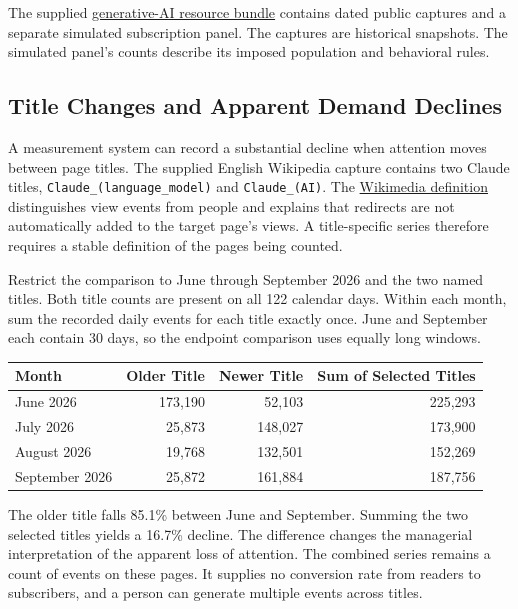 The supplied
\href{../01_Resources/08_M8_Current_Topics_in_Marketing/genai_demand_lab/README.md}{generative-AI
resource bundle} contains dated public captures and a separate simulated
subscription panel. The captures are historical snapshots. The simulated
panel's counts describe its imposed population and behavioral rules.

\hypertarget{M02-title-changes-and-apparent-demand-declines}{%
\subsection{Title Changes and Apparent Demand
Declines}\label{M02-title-changes-and-apparent-demand-declines}}

\noindent A measurement system can record a substantial decline when attention
moves between page titles. The supplied English Wikipedia capture
contains two Claude titles, \texttt{Claude\_(language\_model)} and
\texttt{Claude\_(AI)}. The
\href{https://doc.wikimedia.org/generated-data-platform/aqs/analytics-api/concepts/page-views.html}{Wikimedia
definition} distinguishes view events from people and explains that
redirects are not automatically added to the target page's views. A
title-specific series therefore requires a stable definition of the
pages being counted.

Restrict the comparison to June through September 2026 and the two named
titles. Both title counts are present on all 122 calendar days. Within
each month, sum the recorded daily events for each title exactly once.
June and September each contain 30 days, so the endpoint comparison uses
equally long windows.

\begin{table}[H]
\centering\small
\begin{tabular}{@{}lrrr@{}}
\toprule
Month & Older Title & Newer Title & Sum of Selected Titles \\
\midrule

June 2026 & 173,190 & 52,103 & 225,293 \\
July 2026 & 25,873 & 148,027 & 173,900 \\
August 2026 & 19,768 & 132,501 & 152,269 \\
September 2026 & 25,872 & 161,884 & 187,756 \\
\bottomrule
\end{tabular}
\end{table}

The older title falls 85.1\% between June and September. Summing the two
selected titles yields a 16.7\% decline. The difference changes the
managerial interpretation of the apparent loss of attention. The
combined series remains a count of events on these pages. It supplies no
conversion rate from readers to subscribers, and a person can generate
multiple events across titles.

